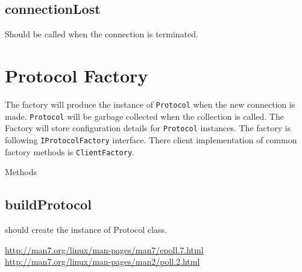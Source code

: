 \documentclass{article}
\begin{document}
    \subsection{connectionLost} Should be called when the connection is
    terminated.

  \section{Protocol Factory}
    The factory will produce the instance of \texttt{Protocol} when the new
    connection is made. \texttt{Protocol} will be garbage collected when the
    collection is called. The Factory will store configuration details for
    \texttt{Protocol} instances. The factory is following
    \texttt{IProtocolFactory} interface. There client implementation of common
    factory methods is \texttt{ClientFactory}.

    Methods

    \subsection{buildProtocol} should create the instance of Protocol class.

  \begin{thebibliography}{2}
      \url{http://man7.org/linux/man-pages/man7/epoll.7.html}%
      \url{http://man7.org/linux/man-pages/man2/poll.2.html}%
  \end{thebibliography}
\end{document}
